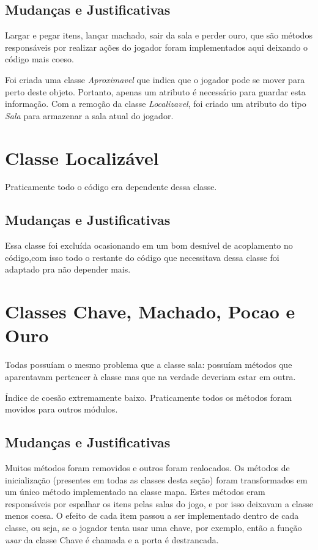 \documentclass[runningheads,a4paper]{llncs}
\begin{document}
    \subsection{Mudanças e Justificativas}
        Largar e pegar itens, lançar machado, sair da sala e perder ouro, que são métodos responsáveis por realizar ações do jogador foram implementados aqui deixando o código mais coeso.
        
        Foi criada uma classe \emph{Aproximavel} que indica que o jogador pode se mover para perto deste objeto. Portanto, apenas um atributo é necessário para guardar esta informação. Com a remoção da classe \emph{Localizavel}, foi criado um atributo do tipo \emph{Sala} para armazenar a sala atual do jogador.

\section{Classe Localizável}
    Praticamente todo o código era dependente dessa classe.

    \subsection{Mudanças e Justificativas}
        Essa classe foi excluída ocasionando em um bom desnível de acoplamento no código,com isso todo o restante do código que necessitava dessa classe foi adaptado pra não depender mais. 

\section{Classes Chave, Machado, Pocao e Ouro}
    Todas possuíam o mesmo problema que a classe sala: possuíam métodos que aparentavam pertencer à classe mas que na verdade deveriam estar em outra.
    
    Índice de coesão extremamente baixo. Praticamente todos os métodos foram movidos para outros módulos.
    
    \subsection{Mudanças e Justificativas}
        Muitos métodos foram removidos e outros foram realocados. Os métodos de inicialização (presentes em todas as classes desta seção) foram transformados em um único método implementado na classe mapa. Estes métodos eram responsáveis por espalhar os itens pelas salas do jogo, e por isso deixavam a classe menos coesa.
        O efeito de cada item passou a ser implementado dentro de cada classe, ou seja, se o jogador tenta usar uma chave, por exemplo, então a função \emph{usar} da classe Chave é chamada e a porta é destrancada.
        
\end{document}
